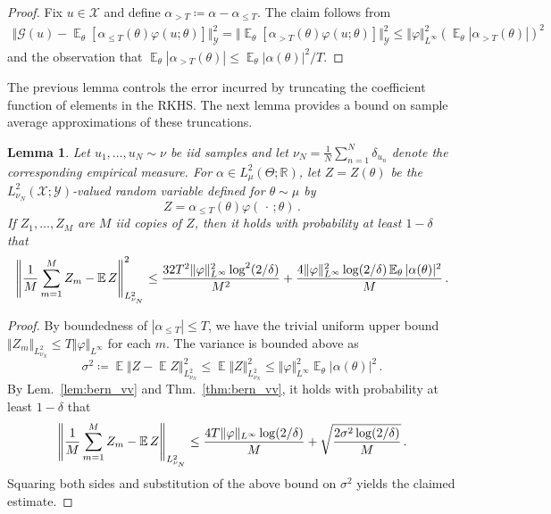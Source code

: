 \documentclass{article}
\theoremstyle{plain}
\newtheorem{lemma}[theorem]{Lemma}
\theoremstyle{my_def}
\theoremstyle{my_rem}
\numberwithin{equation}{section}
\numberwithin{theorem}{section}%
\newcommand{\R}{\mathbb{R}}
\newcommand{\E}{\mathbb{E}}
\newcommand{\cG}{\mathcal{G}}
\newcommand{\cX}{\mathcal{X}}
\newcommand{\cY}{\mathcal{Y}}
\let\originalleft\left %
\let\originalright\right
\renewcommand{\left}{\mathopen{}\mathclose\bgroup\originalleft}
\renewcommand{\right}{\aftergroup\egroup\originalright}
\newcommand{\slot}{{\,\cdot\,}}
\newcommand{\defeq}{\coloneqq} %
\renewcommand{\E}{\operatorname{\mathbb{E}}} %
\newcommand{\al}{\alpha}
\renewcommand{\phi}{\varphi}
\begin{document}
\begin{proof}
Fix $u\in \cX$ and define $\al_{>T} \defeq \al - \al_{\le T}$. 
The claim follows from
\begin{align*}
\Vert \cG(u) - \E_\theta[\al_{\le T}(\theta) \phi(u;\theta)]\Vert_{\cY}^2
= \Vert \E_\theta[\al_{> T}(\theta) \phi(u;\theta)] \Vert_{\cY}^2
\le \Vert \phi \Vert_{L^\infty}^2 (\E_\theta|\al_{>T}(\theta)|)^2
\end{align*}
and the observation that $\E_\theta|\al_{>T}(\theta)| \le \E_\theta|\alpha(\theta)|^2/T$.
\end{proof}

The previous lemma controls the error incurred by truncating the coefficient function of elements in the RKHS. The next lemma provides a bound on sample average approximations of these truncations.
\begin{lemma}
\label{lem:2}
Let $u_1,\dots, u_N \sim \nu$ be iid samples and let $\nu_N = \frac{1}{N} \sum_{n=1}^N \delta_{u_n}$ denote the corresponding empirical measure. For $\al\in L^2_\mu(\Theta;\R)$, let $Z=Z(\theta)$ be the $L^2_{\nu_N}(\cX;\cY)$-valued random variable defined for $\theta\sim\mu$ by
\begin{equation}
    Z = \al_{\le T}(\theta) \phi(\slot;\theta)\,.
\end{equation}
If $Z_1,\dots, Z_M$ are $M$ iid copies of $Z$, then it holds with probability at least $1-\delta$ that
\begin{equation}
\left\Vert
 \frac{1}{M} \sum_{m=1}^M Z_m - \E Z
 \right\Vert^2_{L^2_{\nu_N}}
\le
 \frac{32 T^2 \Vert \phi \Vert_{L^\infty}^2 \log^2(2/\delta)}{M^2} + \frac{4\Vert \phi \Vert_{L^\infty}^2\log(2/\delta) \E_\theta |\al(\theta)|^2}{M}\,.
\end{equation}
\end{lemma}

\begin{proof}
By boundedness of $|\al_{\le T}|\le T$, we have the trivial uniform upper bound $\Vert Z_m \Vert_{L^2_{\nu_N}} \le T\Vert \phi \Vert_{L^\infty}$ for each $m$. The variance is bounded above as
\begin{equation*}
    \sigma^2 \defeq \E \Vert Z - \E Z \Vert_{L^2_{\nu_N}}^2
\le
\E \Vert Z \Vert_{L^2_{\nu_N}}^2
\le
\Vert \phi \Vert_{L^\infty}^2 \E_\theta|\al(\theta)|^2\,.
\end{equation*}
By Lem.~\ref{lem:bern_vv} and Thm.~\ref{thm:bern_vv}, it holds with probability at least $1-\delta$ that
\begin{equation*}
    \left\Vert \frac{1}M \sum_{m=1}^M Z_m - \E Z \right \Vert_{L^2_{\nu_N}} 
\le 
\frac{4T\Vert \phi \Vert_{L^\infty} \log(2/\delta)}{M} + \sqrt{\frac{2\sigma^2 \log(2/\delta)}{M}}\,.
\end{equation*}
Squaring both sides and substitution of the above bound on $\sigma^2$ yields the claimed estimate.
\end{proof}
\end{document}
